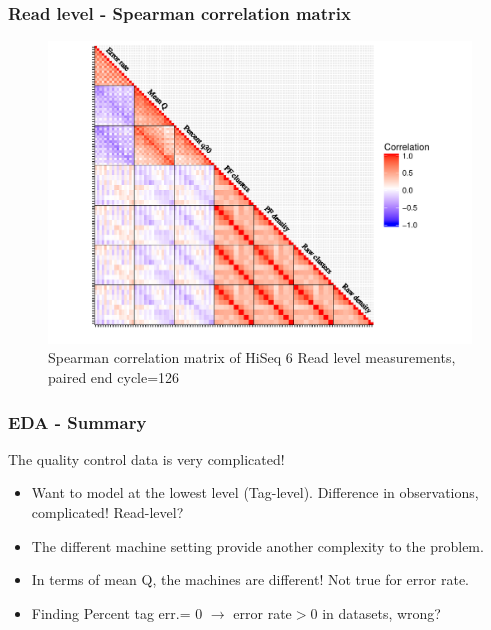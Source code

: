 \documentclass[10pt]{beamer}\usepackage[]{graphicx}\usepackage[]{color}
\makeatletter
\def\maxwidth{ %
  \ifdim\Gin@nat@width>\linewidth
    \linewidth
  \else
    \Gin@nat@width
  \fi
}
\newenvironment{knitrout}{}{} %
\makeatother
\begin{document}
\begin{frame}\frametitle{Read level - Spearman correlation matrix}
\begin{knitrout}
\color{fgcolor}\begin{figure}
\includegraphics[width=\maxwidth]{figure/ReadlvlCor-1} \caption[Spearman correlation matrix of HiSeq 6 Read level measurements, paired end cycle=126]{Spearman correlation matrix of HiSeq 6 Read level measurements, paired end cycle=126}\label{fig:ReadlvlCor}
\end{figure}


\end{knitrout}
\end{frame}


\begin{frame}\frametitle{EDA - Summary}
The quality control data is very complicated! 
\begin{itemize}
\item Want to model at the lowest level (Tag-level). Difference in observations, complicated! Read-level? 
\item The different machine setting provide another complexity to the problem.
\item In terms of mean Q, the machines are different! Not true for error rate. 
\item Finding Percent tag err.= 0 $\rightarrow$ error rate$>0$ in datasets, wrong? 
\end{itemize}
\end{frame}
\end{document}
